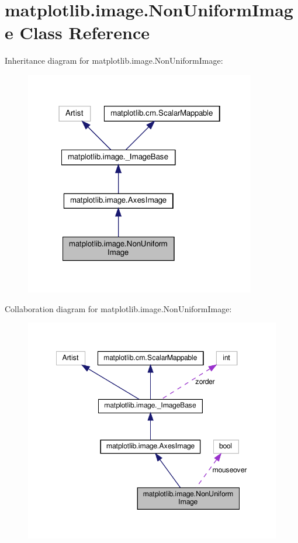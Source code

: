 \hypertarget{classmatplotlib_1_1image_1_1NonUniformImage}{}\section{matplotlib.\+image.\+Non\+Uniform\+Image Class Reference}
\label{classmatplotlib_1_1image_1_1NonUniformImage}


Inheritance diagram for matplotlib.\+image.\+Non\+Uniform\+Image\+:
\nopagebreak
\begin{figure}[H]
\begin{center}
\leavevmode
\includegraphics[width=286pt]{classmatplotlib_1_1image_1_1NonUniformImage__inherit__graph}
\end{center}
\end{figure}


Collaboration diagram for matplotlib.\+image.\+Non\+Uniform\+Image\+:
\nopagebreak
\begin{figure}[H]
\begin{center}
\leavevmode
\includegraphics[width=348pt]{classmatplotlib_1_1image_1_1NonUniformImage__coll__graph}
\end{center}
\end{figure}
